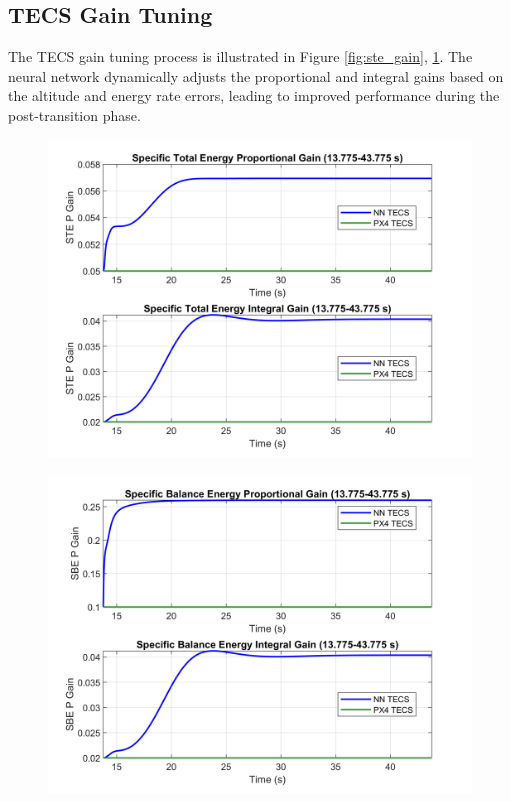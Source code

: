 \documentclass[journal,article,submit,pdftex,moreauthors]{Definitions/mdpi}
\begin{document}
\subsection{TECS Gain Tuning}
The TECS gain tuning process is illustrated in Figure \ref{fig:ste_gain}, \ref{fig:sbe_gain}. The neural network dynamically adjusts the proportional and integral gains based on the altitude and energy rate errors, leading to improved performance during the post-transition phase.
\begin{figure}[H]
    \centering
    \begin{minipage}{0.45\textwidth}
        \centering
        \includegraphics[width=\linewidth]{figures/ste_gain.png}
        \label{fig:ste_gain}
    \end{minipage}
    \hfill
    \begin{minipage}{0.45\textwidth}
        \centering
        \includegraphics[width=\linewidth]{figures/sbe_gain.png}
        \label{fig:sbe_gain}
    \end{minipage}
\end{figure}
\end{document}
